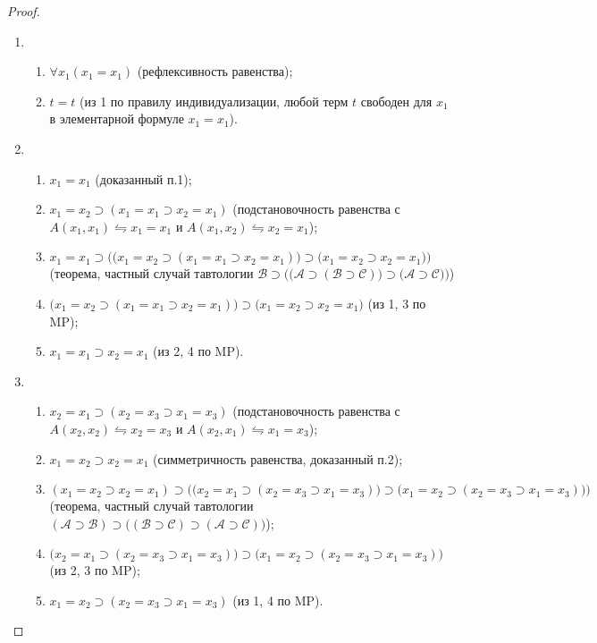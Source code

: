 \begin{proof}\leavevmode
    \begin{enumerate}[label=\arabic*)]
        \item
        \begin{enumerate}[label=\arabic*.]
            \item $\forall x_1(x_1 = x_1)$ (рефлексивность равенства);
            \item $t = t$ (из 1 по правилу индивидуализации, любой терм $t$ свободен для $x_1$ в элементарной формуле $x_1 = x_1$).
        \end{enumerate}

        \item
        \begin{enumerate}[label=\arabic*.]
            \item $x_1 = x_1$ (доказанный п.1);
            \item $x_1 = x_2 \supset (x_1 = x_1 \supset x_2 = x_1)$ (подстановочность равенства с $A(x_1, x_1) \leftrightharpoons x_1 = x_1$ и $A(x_1, x_2) \leftrightharpoons x_2 = x_1$);
            \item $x_1 = x_1 \supset \Big(\big(x_1 = x_2 \supset (x_1 = x_1 \supset x_2 = x_1)\big) \supset \big(x_1 = x_2 \supset x_2 = x_1\big)\Big)$ (теорема, частный случай тавтологии $\mathcal{B} \supset \Big(\big(\mathcal{A} \supset (\mathcal{B} \supset \mathcal{C})\big) \supset \big(\mathcal{A} \supset \mathcal{C}\big)\Big)$)
            \item $\big(x_1 = x_2 \supset (x_1 = x_1 \supset x_2 = x_1)\big) \supset \big(x_1 = x_2 \supset x_2 = x_1\big)$ (из 1, 3 по MP);
            \item $x_1 = x_1 \supset x_2 = x_1$ (из 2, 4 по MP).
        \end{enumerate}

        \item 
        \begin{enumerate}[label=\arabic*.]
            \item $x_2 = x_1 \supset (x_2 = x_3 \supset x_1 = x_3)$ (подстановочность равенства с $A(x_2, x_2) \leftrightharpoons x_2 = x_3$ и $A(x_2, x_1) \leftrightharpoons x_1 = x_3$);
            \item $x_1 = x_2 \supset x_2 = x_1$ (симметричность равенства, доказанный п.2);
            \item $(x_1 = x_2 \supset x_2 = x_1) \supset \Big(\big(x_2 = x_1 \supset (x_2 = x_3 \supset x_1 = x_3)\big) \supset \big(x_1 = x_2 \supset (x_2 = x_3 \supset x_1 = x_3)\big)\Big)$ (теорема, частный случай тавтологии $(\mathcal{A} \supset \mathcal{B}) \supset \big((\mathcal{B} \supset \mathcal{C}) \supset (\mathcal{A} \supset \mathcal{C})\big)$);
            \item $\big(x_2 = x_1 \supset (x_2 = x_3 \supset x_1 = x_3)\big) \supset \big(x_1 = x_2 \supset (x_2 = x_3 \supset x_1 = x_3)\big)$ (из 2, 3 по MP);
            \item $x_1 = x_2 \supset (x_2 = x_3 \supset x_1 = x_3)$ (из 1, 4 по MP).
        \end{enumerate}
    \end{enumerate}
\end{proof}
